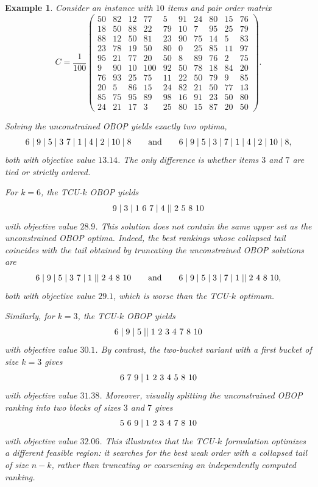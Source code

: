 \documentclass[pdflatex,basic,Numbered]{jnl}%
\theoremstyle{plain}
\newtheorem{example}{Example}
\theoremstyle{remark}
\theoremstyle{thmstyleone}%
\theoremstyle{thmstylethree}%
\begin{document}
\begin{example}\label{ex:contraejemplo_top-k}
Consider an instance with \(10\) items and pair order matrix
\[
C=\frac{1}{100}
\begin{pmatrix}
  50 & 82 & 12 & 77 &  5 & 91 & 24 & 80 & 15 & 76 \\
  18 & 50 & 88 & 22 & 79 & 10 &  7 & 95 & 25 & 79 \\
  88 & 12 & 50 & 81 & 23 & 90 & 75 & 14 &  5 & 83 \\
  23 & 78 & 19 & 50 & 80 &  0 & 25 & 85 & 11 & 97 \\
  95 & 21 & 77 & 20 & 50 &  8 & 89 & 76 &  2 & 75 \\
   9 & 90 & 10 &100 & 92 & 50 & 78 & 18 & 84 & 20 \\
  76 & 93 & 25 & 75 & 11 & 22 & 50 & 79 &  9 & 85 \\
  20 &  5 & 86 & 15 & 24 & 82 & 21 & 50 & 77 & 13 \\
  85 & 75 & 95 & 89 & 98 & 16 & 91 & 23 & 50 & 80 \\
  24 & 21 & 17 &  3 & 25 & 80 & 15 & 87 & 20 & 50
\end{pmatrix}.
\]

Solving the unconstrained {\rm OBOP} yields exactly two optima,
\[
{\rm 6 \mid 9 \mid 5 \mid 3\ 7 \mid 1 \mid 4 \mid 2 \mid 10 \mid 8}
\qquad\text{and}\qquad
{\rm 6 \mid 9 \mid 5 \mid 3 \mid 7 \mid 1 \mid 4 \mid 2 \mid 10 \mid 8},
\]
both with objective value \(13.14\). The only difference is whether items \(3\) and \(7\) are tied or strictly ordered.

For \(k=6\), the {\rm TCU-\(k\) OBOP} yields
\[
{\rm 9 \mid 3 \mid 1\ 6\ 7 \mid 4 \mid\mid 2\ 5\ 8\ 10}
\]
with objective value \(28.9\). This solution does not contain the same upper set as the unconstrained {\rm OBOP} optima. Indeed, the best rankings whose collapsed tail coincides with the tail obtained by truncating the unconstrained {\rm OBOP} solutions are
\[
{\rm 6 \mid 9 \mid 5 \mid 3\ 7 \mid 1 \mid\mid 2\ 4\ 8\ 10}
\qquad\text{and}\qquad
{\rm 6 \mid 9 \mid 5 \mid 3 \mid 7 \mid 1 \mid\mid 2\ 4\ 8\ 10},
\]
both with objective value \(29.1\), which is worse than the {\rm TCU-\(k\)} optimum.

Similarly, for \(k=3\), the {\rm TCU-\(k\) OBOP} yields
\[
{\rm 6 \mid 9 \mid 5 \mid\mid 1\ 2\ 3\ 4\ 7\ 8\ 10}
\]
with objective value \(30.1\). By contrast, the two-bucket variant with a first bucket of size \(k=3\) gives
\[
{\rm 6\ 7\ 9 \mid 1\ 2\ 3\ 4\ 5\ 8\ 10}
\]
with objective value \(31.38\). Moreover, visually splitting the unconstrained {\rm OBOP} ranking into two blocks of sizes \(3\) and \(7\) gives
\[
{\rm 5\ 6\ 9 \mid 1\ 2\ 3\ 4\ 7\ 8\ 10}
\]
with objective value \(32.06\). This illustrates that the {\rm TCU-\(k\)} formulation optimizes a different feasible region: it searches for the best weak order with a collapsed tail of size \(n-k\), rather than truncating or coarsening an independently computed ranking.
\end{example}
\end{document}

